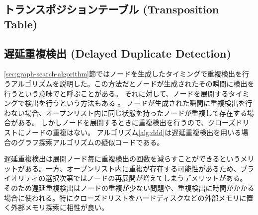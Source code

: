 \subsection{トランスポジションテーブル (Transposition Table)}



\subsection{遅延重複検出 (Delayed Duplicate Detection)}
\label{sec:delayed-duplicate-detection}

\ref{sec:graph-search-algorithm}節ではノードを生成したタイミングで重複検出を行うアルゴリズムを説明した。この方法だとノードが生成されたその瞬間に検出を行うという意味でと呼ぶことがある。
それに対して、ノードを展開するタイミングで検出を行うという方法もある \cite{korf2003delayed}。
ノードが生成された瞬間に重複検出を行わない場合、オープンリスト内に同じ状態を持ったノードが重複して存在する場合がある。
しかしノードを展開するときに重複検出を行うので、クローズドリストにノードの重複はない。
アルゴリズム\ref{alg:ddd}は遅延重複検出を用いる場合のグラフ探索アルゴリズムの疑似コードである。

遅延重複検出は展開ノード毎に重複検出の回数を減らすことができるというメリットがある。一方、オープンリスト内に重複が存在する可能性があるため、プライオリティの選択次第ではノードの再展開が増えてしまうデメリットがある。
そのため遅延重複検出はノードの重複が少ない問題や、重複検出に時間がかかる場合に使われる。特にクローズドリストをハードディスクなどの外部メモリに置く外部メモリ探索に相性が良い。


